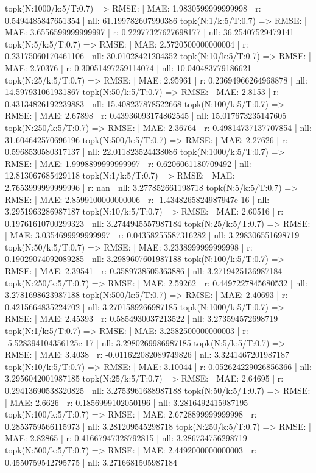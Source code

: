 topk(N:1000/k:5/T:0.7) => RMSE: | MAE: 1.9830599999999998 | r: 0.5494485847651354 | nll: 61.199782607990386
topk(N:1/k:5/T:0.7) => RMSE: | MAE: 3.6556599999999997 | r: 0.22977327627698177 | nll: 36.25407529479141
topk(N:5/k:5/T:0.7) => RMSE: | MAE: 2.5720500000000004 | r: 0.23175060170461106 | nll: 30.01028421204352
topk(N:10/k:5/T:0.7) => RMSE: | MAE: 2.70376 | r: 0.30051497259114074 | nll: 10.040483779186621
topk(N:25/k:5/T:0.7) => RMSE: | MAE: 2.95961 | r: 0.23694966264968878 | nll: 14.597931061931867
topk(N:50/k:5/T:0.7) => RMSE: | MAE: 2.8153 | r: 0.43134826192239883 | nll: 15.408237878522668
topk(N:100/k:5/T:0.7) => RMSE: | MAE: 2.67898 | r: 0.43936093174862545 | nll: 15.017673235147605
topk(N:250/k:5/T:0.7) => RMSE: | MAE: 2.36764 | r: 0.49814737137707854 | nll: 31.604642570696196
topk(N:500/k:5/T:0.7) => RMSE: | MAE: 2.27626 | r: 0.5968530580317137 | nll: 22.011823524438086
topk(N:1000/k:5/T:0.7) => RMSE: | MAE: 1.9998899999999997 | r: 0.6206061180709492 | nll: 12.813067685429118
topk(N:1/k:5/T:0.7) => RMSE: | MAE: 2.7653999999999996 | r: nan | nll: 3.277852661198718
topk(N:5/k:5/T:0.7) => RMSE: | MAE: 2.8599100000000006 | r: -1.4348265824987947e-16 | nll: 3.2951963286987187
topk(N:10/k:5/T:0.7) => RMSE: | MAE: 2.60516 | r: 0.19761610700299323 | nll: 3.2744945557987184
topk(N:25/k:5/T:0.7) => RMSE: | MAE: 3.0354699999999997 | r: 0.04358255587316282 | nll: 3.298306551698719
topk(N:50/k:5/T:0.7) => RMSE: | MAE: 3.2338999999999998 | r: 0.19029074092089285 | nll: 3.2989607601987188
topk(N:100/k:5/T:0.7) => RMSE: | MAE: 2.39541 | r: 0.3589738505363886 | nll: 3.2719425136987184
topk(N:250/k:5/T:0.7) => RMSE: | MAE: 2.59262 | r: 0.4497227845680532 | nll: 3.2781698623987188
topk(N:500/k:5/T:0.7) => RMSE: | MAE: 2.40693 | r: 0.4215664835224702 | nll: 3.2701589266987185
topk(N:1000/k:5/T:0.7) => RMSE: | MAE: 2.45393 | r: 0.5854930037213522 | nll: 3.273594572698719
topk(N:1/k:5/T:0.7) => RMSE: | MAE: 3.2582500000000003 | r: -5.528394104356125e-17 | nll: 3.2980269986987185
topk(N:5/k:5/T:0.7) => RMSE: | MAE: 3.4038 | r: -0.011622082089749826 | nll: 3.3241467201987187
topk(N:10/k:5/T:0.7) => RMSE: | MAE: 3.10044 | r: 0.052624229026856366 | nll: 3.2956042001987185
topk(N:25/k:5/T:0.7) => RMSE: | MAE: 2.64695 | r: 0.29413690538320825 | nll: 3.2753961688987188
topk(N:50/k:5/T:0.7) => RMSE: | MAE: 2.6626 | r: 0.1856999102050196 | nll: 3.2816492415987195
topk(N:100/k:5/T:0.7) => RMSE: | MAE: 2.6728899999999998 | r: 0.2853759566115973 | nll: 3.281209545298718
topk(N:250/k:5/T:0.7) => RMSE: | MAE: 2.82865 | r: 0.41667947328792815 | nll: 3.286734756298719
topk(N:500/k:5/T:0.7) => RMSE: | MAE: 2.4492000000000003 | r: 0.4550759542795775 | nll: 3.2716681505987184

